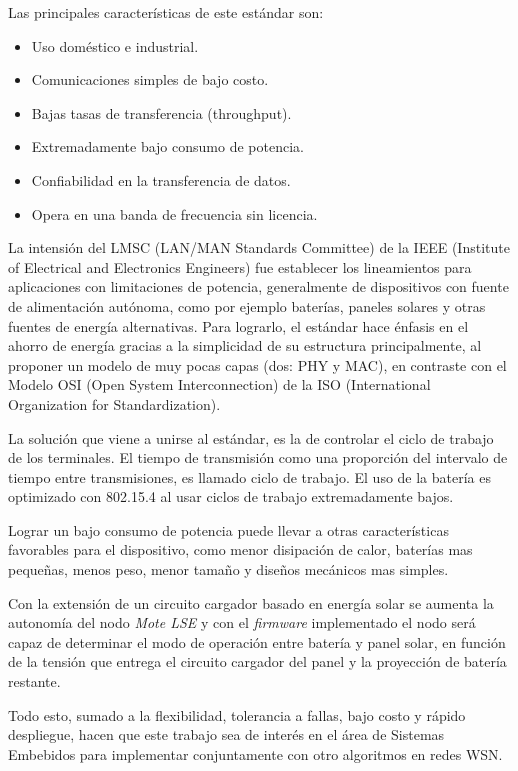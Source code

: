 \noindent Las principales características de este estándar son:
		\begin{itemize}
			\item Uso doméstico e industrial.
			\item Comunicaciones simples de bajo costo. 
			\item Bajas tasas de transferencia (throughput).
			\item Extremadamente bajo consumo de potencia.
			\item Confiabilidad en la transferencia de datos.
			\item Opera en una banda de frecuencia sin licencia.
		\end{itemize}

La intensión del LMSC (LAN/MAN Standards Committee) de la IEEE (Institute of Electrical and Electronics Engineers) fue establecer los lineamientos para aplicaciones con limitaciones de potencia, generalmente de dispositivos con fuente de alimentación autónoma, como por ejemplo baterías, paneles solares y otras fuentes de energía alternativas. Para lograrlo, el estándar hace énfasis en el ahorro de energía gracias a la simplicidad de su estructura principalmente, al proponer un modelo de muy pocas capas (dos: PHY y MAC), en contraste con el Modelo OSI (Open System Interconnection) de la ISO (International Organization for Standardization).

La solución que viene a unirse al estándar, es la de controlar el ciclo de trabajo de los terminales. El tiempo de transmisión como una proporción del intervalo de tiempo entre transmisiones, es llamado ciclo de trabajo. El uso de la batería es optimizado con 802.15.4 al usar ciclos de trabajo extremadamente bajos.

Lograr un bajo consumo de potencia puede llevar a otras características favorables para el dispositivo, como menor disipación de calor, baterías mas pequeñas, menos peso, menor tamaño y diseños mecánicos mas simples. 
		
Con la extensión de un circuito cargador basado en energía solar se aumenta la autonomía del nodo \textit{Mote LSE} y con el \textit{firmware} implementado el nodo será capaz de determinar el modo de operación entre batería y panel solar, en función de la tensión que entrega el circuito cargador del panel y la proyección de batería restante.

Todo esto, sumado a la flexibilidad, tolerancia a fallas, bajo costo y rápido despliegue, hacen que este trabajo sea de interés en el área de Sistemas Embebidos para implementar conjuntamente con otro algoritmos en redes WSN.

